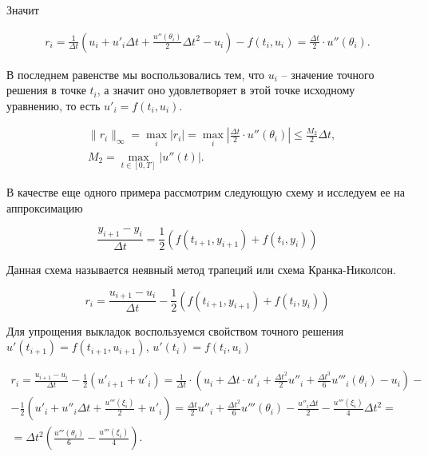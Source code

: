 \documentclass[10pt,a4paper]{article}
\begin{document}
	Значит
	
	\begin{align}
		r_{i} = \frac{1}{\Delta t}\left(u_{i} + u'_{i}\Delta t + 
		\frac{u''\left(\theta_{i}\right)}{2}\Delta t^2 - u_{i}\right) - 
		f\left(t_{i}, u_{i}\right) 	= \frac{\Delta t}{2} \cdot 
		u''\left(\theta_{i}\right).
	\end{align}
	
	В последнем равенстве мы воспользовались тем, что $u_i$ -- значение точного 
	решения в точке $t_i$, а значит оно удовлетворяет в этой точке исходному 
	уравнению, то есть $u'_i=f(t_i, u_i)$.
	
		\begin{align}
	&\parallel r_{i} \parallel_\infty = \max_i |r_i| = \max_i \left| 
	\frac{\Delta t}{2} \cdot 
	u''\left(\theta_{i}\right)\right|\leqslant\frac{M_2}{2}\Delta t, \\
	&M_2 = \max_{t\in[0,T]} |u''(t)|. 
	\end{align}
	
	В качестве еще одного примера рассмотрим следующую схему и исследуем ее на 
	аппроксимацию
	
	\begin{equation}
		\frac{y_{i + 1} - y_{i}}{\Delta t} = \frac{1}{2}\left(f\left(t_{i + 1}, 
		y_{i + 1}\right) + f\left(t_{i}, y_{i}\right)\right)
	\end{equation}
	
	Данная схема называется неявный метод трапеций или схема Кранка-Николсон.
	
	\begin{equation}
		r_{i} = \frac{u_{i + 1} - u_{i}}{\Delta t} - \frac{1}{2}\left(
		f\left(t_{i + 1}, 
		y_{i + 1}\right) + f\left(t_{i}, y_{i}\right)\right)
	\end{equation}
	
	Для упрощения выкладок воспользуемся свойством точного решения $u'(t_{i
	+1})=f(t_{i+1}, u_{i+1})$, $u'(t_{i})=f(t_{i}, u_{i})$
	
	\begin{align}
		r_{i} = \frac{u_{i + 1} - u_{i}}{\Delta t} - \frac{1}{2}\left(u'_{i + 1}
		+ u'_{i}\right) = \frac{1}{\Delta t}\cdot \left(u_{i} + \Delta t\cdot
		u'_{i} + \frac{\Delta t^2}{2}u''_{i} + \frac{\Delta t^3}{6}u'''_{i}
		\left(\theta_{i}\right)- u_{i}\right)  -
		\\
		-\frac{1}{2}\left(u'_{i} + u''_{i}\Delta t + \frac{u'''\left(\xi_{i}
		\right)}{2} + u'_{i}\right) = 
		\frac{\Delta t}{2}u''_{i} + \frac{\Delta t^2}{6}u'''\left(\theta_{i}
		\right) - \frac{u''_{i}\Delta t}{2} - \frac{u'''\left(\xi_{i}\right)}{4}
		\Delta t^{2} = 
		\\
		=\Delta t^{2}\left(\frac{u'''\left(\theta_{i}\right)}{6} - 
		\frac{u'''\left(\xi_{i}\right)}{4}\right).
	\end{align}
	
\end{document}
